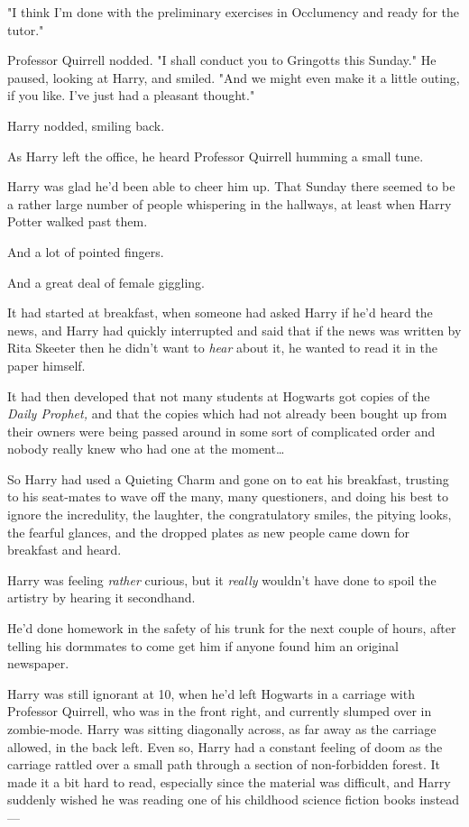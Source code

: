 "I think I'm done with the preliminary exercises in Occlumency and ready for 
the tutor."

Professor Quirrell nodded. "I shall conduct you to Gringotts this Sunday." He 
paused, looking at Harry, and smiled. "And we might even make it a little 
outing, if you like. I've just had a pleasant thought."

Harry nodded, smiling back.

As Harry left the office, he heard Professor Quirrell humming a small tune.

Harry was glad he'd been able to cheer him up.
\sbreak
That Sunday there seemed to be a rather large number of people whispering in 
the hallways, at least when Harry Potter walked past them.

And a lot of pointed fingers.

And a great deal of female giggling.

It had started at breakfast, when someone had asked Harry if he'd heard the 
news, and Harry had quickly interrupted and said that if the news was written 
by Rita Skeeter then he didn't want to \emph{hear} about it, he wanted to read 
it in the paper himself.

It had then developed that not many students at Hogwarts got copies of the 
\emph{Daily Prophet,} and that the copies which had not already been bought up 
from their owners were being passed around in some sort of complicated order 
and nobody really knew who had one at the moment{\ldots}

So Harry had used a Quieting Charm and gone on to eat his breakfast, trusting 
to his seat-mates to wave off the many, many questioners, and doing his best to 
ignore the incredulity, the laughter, the congratulatory smiles, the pitying 
looks, the fearful glances, and the dropped plates as new people came down for 
breakfast and heard.

Harry was feeling \emph{rather} curious, but it \emph{really} wouldn't have 
done to spoil the artistry by hearing it secondhand.

He'd done homework in the safety of his trunk for the next couple of hours, 
after telling his dormmates to come get him if anyone found him an original 
newspaper.

Harry was still ignorant at 10\AM, when he'd left Hogwarts in a carriage with 
Professor Quirrell, who was in the front right, and currently slumped over in 
zombie-mode. Harry was sitting diagonally across, as far away as the carriage 
allowed, in the back left. Even so, Harry had a constant feeling of doom as the 
carriage rattled over a small path through a section of non-forbidden forest. 
It made it a bit hard to read, especially since the material was difficult, and 
Harry suddenly wished he was reading one of his childhood science fiction books 
instead---

